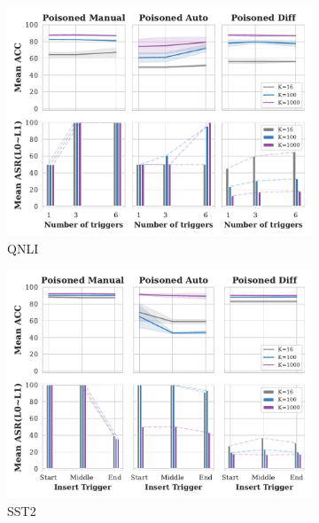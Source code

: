 \begin{figure}[!ht]
\begin{subfigure}{.33\textwidth}
  \centering
  \includegraphics[width=\linewidth]{figures/evaluation_media/QNLI_num_trigger_impacts.pdf}
  \caption{QNLI}
  \label{fig:qnli_trigger_impacts}
\end{subfigure}%
\begin{subfigure}{.33\textwidth}
  \centering
  \includegraphics[width=\linewidth]{figures/evaluation_media/SST2_insert_pos_impacts.pdf}
  \caption{SST2}
  \label{fig:sst2_insert_pos_impacts}
\end{subfigure}%
\begin{subfigure}{.33\textwidth}
  \centering

\end{subfigure}
\end{figure}
